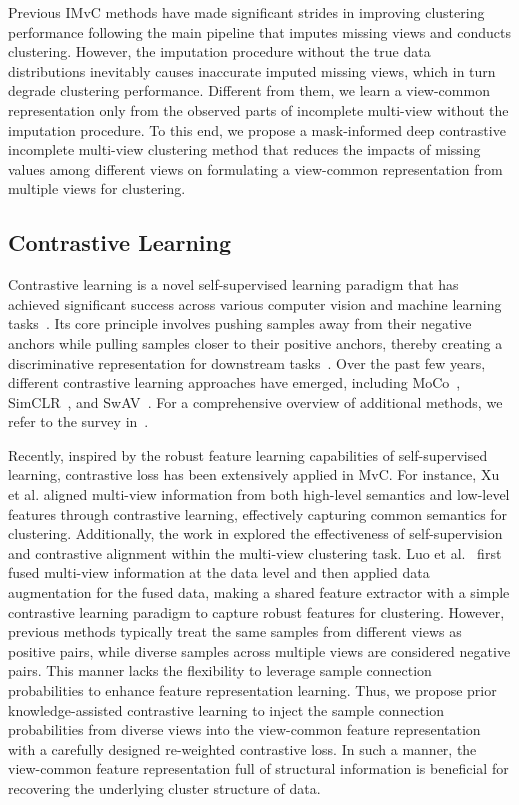 Previous IMvC methods have made significant strides in improving clustering performance following the main pipeline that imputes missing views and conducts clustering. However, the imputation procedure without the true data distributions inevitably causes inaccurate imputed missing views, which in turn degrade clustering performance. Different from them, we learn a view-common representation only from the observed parts of incomplete multi-view without the imputation procedure. To this end, we propose a mask-informed deep contrastive incomplete multi-view clustering method that reduces the impacts of missing values among different views on formulating a view-common representation from multiple views for clustering.

\subsection{Contrastive Learning}

Contrastive learning is a novel self-supervised learning paradigm that has achieved significant success across various computer vision and machine learning tasks~\cite{krishnan2022self, liu2021self}. Its core principle involves pushing samples away from their negative anchors while pulling samples closer to their positive anchors, thereby creating a discriminative representation for downstream tasks~\cite{khosla2020supervised}. Over the past few years, different contrastive learning approaches have emerged, including MoCo~\cite{he2020momentum}, SimCLR~\cite{chen2020simple}, and SwAV~\cite{caron2020unsupervised}. For a comprehensive overview of additional methods, we refer to the survey in~\cite{gui2024survey}. 

Recently, inspired by the robust feature learning capabilities of self-supervised learning, contrastive loss has been extensively applied in MvC. For instance, Xu et al.\cite{xu2022multi} aligned multi-view information from both high-level semantics and low-level features through contrastive learning, effectively capturing common semantics for clustering. Additionally, the work in\cite{trosten2023effects} explored the effectiveness of self-supervision and contrastive alignment within the multi-view clustering task. Luo et al.~\cite{luo2024simple} first fused multi-view information at the data level and then applied data augmentation for the fused data, making a shared feature extractor with a simple contrastive learning paradigm to capture robust features for clustering. However, previous methods typically treat the same samples from different views as positive pairs, while diverse samples across multiple views are considered negative pairs. This manner lacks the flexibility to leverage sample connection probabilities to enhance feature representation learning. Thus, we propose prior knowledge-assisted contrastive learning to inject the sample connection probabilities from diverse views into the view-common feature representation with a carefully designed re-weighted contrastive loss. In such a manner, the view-common feature representation full of structural information is beneficial for recovering the underlying cluster structure of data.



